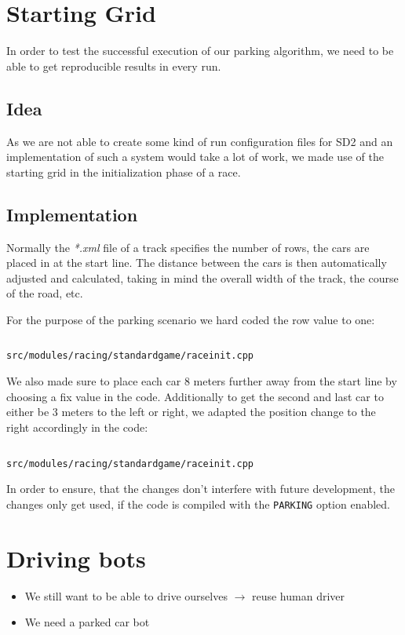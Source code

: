 \documentclass[paper=a4, fontsize=11pt]{scrreprt}
\begin{document}
\section{Starting Grid}
In order to test the successful execution of our parking algorithm,
we need to be able to get reproducible results in every run.

\subsection{Idea}
As we are not able to create some kind of run configuration files for SD2
and an implementation of such a system would take a lot of work,
we made use of the starting grid in the initialization phase of a race.

\subsection{Implementation}
Normally the \textit{*.xml} file of a track specifies the number of rows,
the cars are placed in at the start line.
The distance between the cars is then automatically adjusted and calculated,
taking in mind the overall width of the track, the course of the road, etc.

For the purpose of the parking scenario we hard coded the row value to one:
\begin{listing}[ht]
  \inputminted[firstline=309,linenos=true,lastline=311]{c++}{../../../simulators/speed-dreams/src/modules/racing/standardgame/raceinit.cpp}
  \caption{\texttt{src/modules/racing/standardgame/raceinit.cpp}}
\end{listing}

We also made sure to place each car 8 meters further away from the start line by choosing a fix value in the code.
Additionally to get the second and last car to either be 3 meters to the left or right,
we adapted the position change to the right accordingly in the code:
\begin{listing}[ht]
  \inputminted[firstline=316,linenos=true,lastline=327]{c++}{../../../simulators/speed-dreams/src/modules/racing/standardgame/raceinit.cpp}
  \caption{\texttt{src/modules/racing/standardgame/raceinit.cpp}}
\end{listing}

In order to ensure, that the changes don't interfere with future development,
the changes only get used, if the code is compiled with the \texttt{PARKING} option enabled.

\section{Driving bots}
\begin{itemize}
  \item We still want to be able to drive ourselves $\rightarrow$ reuse human driver
  \item We need a parked car bot
\end{itemize}
\end{document}
